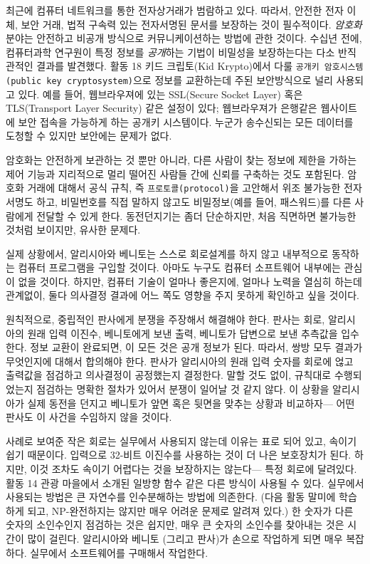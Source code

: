 \documentclass[]{article}
\begin{document}
최근에 컴퓨터 네트워크를 통한 전자상거래가 범람하고 있다. 따라서, 안전한
전자 이체, 보안 거래, 법적 구속력 있는 전자서명된 문서를 보장하는 것이
필수적이다. \emph{암호화} 분야는 안전하고 비공개 방식으로
커뮤니케이션하는 방법에 관한 것이다. 수십년 전에, 컴퓨터과학 연구원이
특정 정보를 \emph{공개}하는 기법이 비밀성을 보장하는다는 다소 반직관적인
결과를 발견했다. 활동 18 키드 크립토(Kid Krypto)에서 다룰
\texttt{공개키 암호시스템(public key cryptosystem)}으로 정보를
교환하는데 주된 보안방식으로 널리 사용되고 있다. 예를 들어, 웹브라우져에
있는 SSL(Secure Socket Layer) 혹은 TLS(Transport Layer Security) 같은
설정이 있다; 웹브라우져가 은행같은 웹사이트에 보안 접속을 가능하게 하는
공개키 시스템이다. 누군가 송수신되는 모든 데이터를 도청할 수 있지만
보안에는 문제가 없다.

암호화는 안전하게 보관하는 것 뿐만 아니라, 다른 사람이 찾는 정보에
제한을 가하는 제어 기능과 지리적으로 멀리 떨어진 사람들 간에 신뢰를
구축하는 것도 포함된다. 암호화 거래에 대해서 공식 규칙, 즉
\texttt{프로토콜(protocol)}을 고안해서 위조 불가능한 전자 서명도 하고,
비밀번호를 직접 말하지 않고도 비밀정보(예를 들어, 패스워드)를 다른
사람에게 전달할 수 있게 한다. 동전던지기는 좀더 단순하지만, 처음
직면하면 불가능한 것처럼 보이지만, 유사한 문제다.

실제 상황에서, 알리시아와 베니토는 스스로 회로설계를 하지 않고
내부적으로 동작하는 컴퓨터 프로그램을 구입할 것이다. 아마도 누구도
컴퓨터 소프트웨어 내부에는 관심이 없을 것이다. 하지만, 컴퓨터 기술이
얼마나 좋은지에, 얼마나 노력을 열심히 하는데 관계없이, 둘다 의사결정
결과에 어느 쪽도 영향을 주지 못하게 확인하고 싶을 것이다.

원칙적으로, 중립적인 판사에게 분쟁을 주장해서 해결해야 한다. 판사는
회로, 알리시아의 원래 입력 이진수, 베니토에게 보낸 출력, 베니토가
답변으로 보낸 추측값을 입수한다. 정보 교환이 완료되면, 이 모든 것은 공개
정보가 된다. 따라서, 쌍방 모두 결과가 무엇인지에 대해서 합의해야 한다.
판사가 알리시아의 원래 입력 숫자를 회로에 얺고 출력값을 점검하고
의사결정이 공정했는지 결정한다. 말할 것도 없이, 규칙대로 수행되었는지
점검하는 명확한 절차가 있어서 분쟁이 일어날 것 같지 않다. 이 상황을
알리시아가 실제 동전을 던지고 베니토가 앞면 혹은 뒷면을 맞추는 상황과
비교하자--- 어떤 판사도 이 사건을 수임하지 않을 것이다.

사례로 보여준 작은 회로는 실무에서 사용되지 않는데 이유는 표로 되어
있고, 속이기 쉽기 때문이다. 입력으로 32-비트 이진수를 사용하는 것이 더
나은 보호장치가 된다. 하지만, 이것 조차도 속이기 어렵다는 것을
보장하지는 않는다--- 특정 회로에 달려있다. 활동 14 관광 마을에서 소개된
일방향 함수 같은 다른 방식이 사용될 수 있다. 실무에서 사용되는 방법은 큰
자연수를 인수분해하는 방법에 의존한다. (다음 활동 말미에 학습하게 되고,
NP-완전하지는 않지만 매우 어려운 문제로 알려져 있다.) 한 숫자가 다른
숫자의 소인수인지 점검하는 것은 쉽지만, 매우 큰 숫자의 소인수를 찾아내는
것은 시간이 많이 걸린다. 알리시아와 베니토 (그리고 판사)가 손으로
작업하게 되면 매우 복잡하다. 실무에서 소프트웨어를 구매해서 작업한다.
\end{document}
